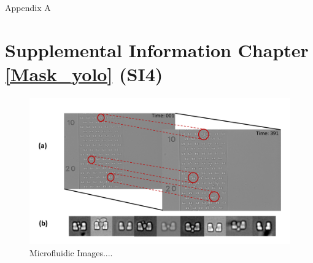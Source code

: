 
\vspace*{0.48in}
 \begin{center}
{Appendix A }
\end{center}


\section{Supplemental Information Chapter \ref{Mask_yolo} (SI4)}


\begin{figure}[!h]
\captionsetup{format=hang}
\centering
\includegraphics[width=1\textwidth,height=0.4\textheight]{dissertation/figures/plusone/S1_Fig_microfluidic.pdf}
\caption {Microfluidic Images.... }
\label{S1_Fig}
\end{figure} 
